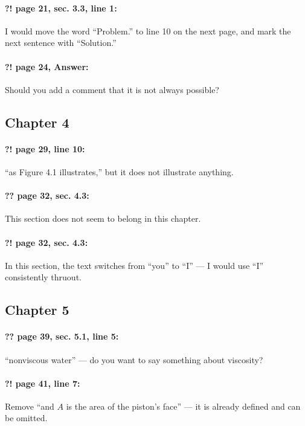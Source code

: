 \documentclass[twoside]{article}
\begin{document}
\paragraph{?! page 21, sec. 3.3, line 1:} I would move the word “Problem.” to line 10 on the next page, and mark the next sentence with “Solution.”

\paragraph{?! page 24, Answer:} Should you add a comment that it is not always possible?

\subsection*{Chapter 4}

\paragraph{?! page 29, line 10:} “as Figure 4.1 illustrates,” but it does not illustrate anything.

\paragraph{?? page 32, sec. 4.3:} This section does not seem to belong in this chapter.

\paragraph{?! page 32, sec. 4.3:} In this section, the text switches from “you” to “I” — I would use “I” consistently thruout.

\subsection*{Chapter 5}

\paragraph{?? page 39, sec. 5.1, line 5:} “nonviscous water” — do you want to say something about viscosity?

\paragraph{?! page 41, line 7:} Remove “and $A$ is the area of the piston’s face” — it is already defined and can be omitted.
\end{document}
